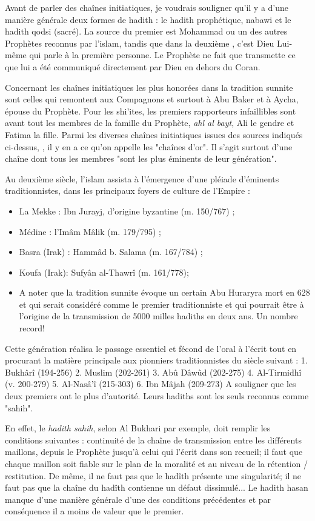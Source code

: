 Avant de parler des chaînes initiatiques, je voudrais souligner qu'il y a d'une manière générale deux formes de hadith : le hadith prophétique, nabawi et le hadith qodsi (sacré). La source du premier est Mohammad ou un des autres Prophètes reconnus par l'islam, tandis que dans la deuxième , c'est Dieu Lui-même qui parle à la première personne. Le Prophète ne fait que transmette ce que lui a été communiqué directement par Dieu en dehors du Coran. 

Concernant les chaînes initiatiques les plus honorées dans la tradition sunnite sont celles qui remontent aux Compagnons et surtout à Abu Baker et à Aycha, épouse du Prophète. Pour les shi'ites, les premiers rapporteurs infaillibles sont avant tout les membres de la famille du Prophète, \textit{ahl al bayt}, Ali le gendre et Fatima la fille.  
Parmi les diverses chaînes initiatiques issues des sources indiqués ci-dessus, , il y en a ce qu'on appelle les "chaînes d'or". Il s'agit surtout d'une chaîne dont tous les membres "sont les plus éminents de leur génération".

Au deuxième siècle, l'islam assista à l’émergence d’une pléiade d’éminents traditionnistes, dans les principaux foyers de culture de l’Empire :
\begin{itemize}
    \item La Mekke : Ibn Jurayj, d’origine byzantine (m. 150/767) ;
\item 	Médine : l’Imâm Mâlik (m. 179/795) ;
\item 	Basra (Irak) : Hammâd b. Salama (m. 167/784) ;
\item 	Koufa (Irak): Sufyân al-Thawrî (m. 161/778);

\item 	A noter que la tradition sunnite évoque un certain Abu Huraryra mort en 628 et qui serait considéré comme le premier traditionniste et qui pourrait être à l'origine de la transmission de 5000 milles hadiths en deux ans.  Un nombre record!
\end{itemize}

Cette génération réalisa le passage essentiel et fécond de l'oral à l'écrit tout en procurant la matière principale aux  pionniers traditionnistes du siècle suivant :
1. Bukhârî (194-256)
2. Muslim (202-261)	
3. Abû Dâwûd (202-275)	
	4. Al-Tirmidhî (v. 200-279)
	5. Al-Nasâ'î (215-303)
	6. Ibn Mâjah (209-273)
A souligner que les deux premiers ont le plus d'autorité. Leurs hadiths sont les seuls reconnus comme "sahih". 

En effet, le \textit{hadith sahih}, selon Al Bukhari par exemple, doit remplir les conditions suivantes : continuité de la chaîne de transmission entre les différents maillons, depuis le Prophète jusqu'à celui qui l'écrit dans son recueil; il faut que chaque maillon soit fiable sur le plan de la moralité 
et au niveau de la rétention / restitution. De même, il ne faut pas que le hadîth présente une singularité; il ne faut pas que la chaîne du hadîth contienne un défaut dissimulé...
Le hadith hasan manque d'une manière générale d'une des conditions précédentes et par conséquence il a moins de valeur que le premier.



